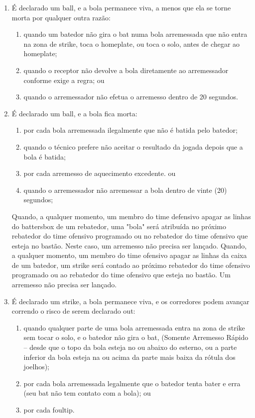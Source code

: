 \begin{enumerate}[label=(\alph*)]\item   É declarado um \gls{ball}, e a bola permanece viva, a menos que ela se torne
 morta por qualquer outra razão:

\begin{enumerate}[label=\roman*.]
	\item  quando um batedor não gira o \gls{bat} numa bola arremessada que não entra na zona de \gls{strike}, toca o \gls{homeplate}, ou toca o solo, antes de chegar ao \gls{homeplate};
	\item quando o receptor não devolve a bola diretamente ao arremessador conforme exige a regra; ou
	\item quando o arremessador não efetua o arremesso dentro de 20 segundos.
\end{enumerate}

\item  É declarado um \gls{ball}, e a bola fica morta:

\begin{enumerate}[label=\roman*.]
	\item por cada bola arremessada ilegalmente que não é batida pelo batedor;
	\item quando o técnico prefere não aceitar o resultado da jogada depois que a  bola é batida;
	\item por cada arremesso de aquecimento excedente. ou
	\item quando o arremessador não arremessar a bola dentro de vinte (20) segundos;
 \end{enumerate}
 Quando, a qualquer momento, um membro do time defensivo apagar as linhas do \gls{battersbox} de um rebatedor, uma "bola" será atribuída no próximo rebatedor do time ofensivo programado ou no rebatedor do time ofensivo que esteja no bastão. Neste caso, um arremesso não precisa ser lançado. Quando, a qualquer momento, um membro do time ofensivo apagar as linhas da caixa de um batedor, um \gls{strike} será contado ao próximo rebatedor do time ofensivo programado ou ao rebatedor do time ofensivo que esteja no bastão. Um arremesso não precisa ser lançado.

\item  É declarado um \gls{strike}, a bola permanece viva, e os corredores podem avançar correndo o risco de serem declarado \gls{out}:

\begin{enumerate}[label=\roman*.]
	\item  quando qualquer parte de uma bola arremessada entra na zona de \gls{strike} sem tocar o solo, e o batedor não gira o \gls{bat}, (Somente Arremesso Rápido -- desde que o topo da bola esteja no ou abaixo do esterno, ou a parte inferior da bola esteja na ou acima da parte mais baixa da rótula dos joelhos);
	\item por cada bola arremessada legalmente que o batedor tenta bater e erra (seu \gls{bat} não tem contato com a bola); ou
	\item por cada \gls{foultip}.
\end{enumerate}


\end{enumerate}
